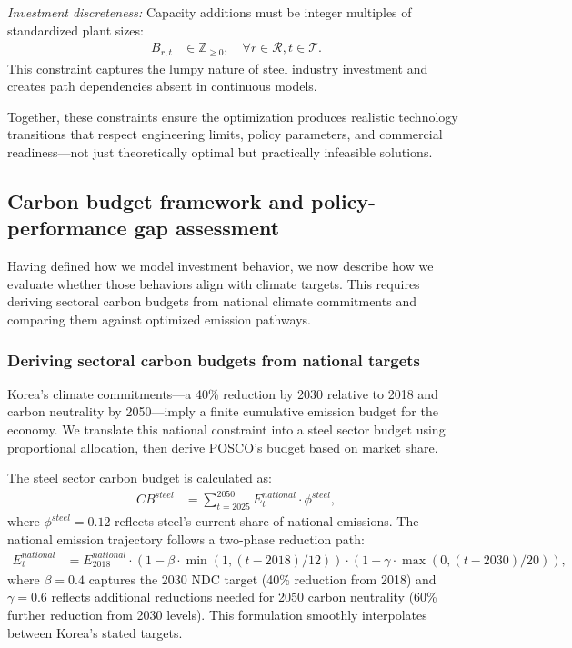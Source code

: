 \documentclass[preprint,1p,authoryear]{elsarticle}
\begin{document}
\textit{Investment discreteness:} Capacity additions must be integer multiples of standardized plant sizes:
\begin{align}
B_{r,t} &\in \mathbb{Z}_{\ge 0}, \quad \forall r \in \mathcal{R}, t \in \mathcal{T}. \label{eq:integer}
\end{align}
This constraint captures the lumpy nature of steel industry investment and creates path dependencies absent in continuous models.

Together, these constraints ensure the optimization produces realistic technology transitions that respect engineering limits, policy parameters, and commercial readiness—not just theoretically optimal but practically infeasible solutions.

\subsection{Carbon budget framework and policy-performance gap assessment}

Having defined how we model investment behavior, we now describe how we evaluate whether those behaviors align with climate targets. This requires deriving sectoral carbon budgets from national climate commitments and comparing them against optimized emission pathways.

\subsubsection{Deriving sectoral carbon budgets from national targets}

Korea's climate commitments—a 40\% reduction by 2030 relative to 2018 and carbon neutrality by 2050—imply a finite cumulative emission budget for the economy. We translate this national constraint into a steel sector budget using proportional allocation, then derive POSCO's budget based on market share.

The steel sector carbon budget is calculated as:
\begin{align}
CB^{steel} &= \sum_{t=2025}^{2050} E^{national}_t \cdot \phi^{steel}, \label{eq:budget_total}
\end{align}
where $\phi^{steel} = 0.12$ reflects steel's current share of national emissions. The national emission trajectory follows a two-phase reduction path:
\begin{align}
E^{national}_t &= E^{national}_{2018} \cdot (1 - \beta \cdot \min(1, (t-2018)/12)) \cdot (1 - \gamma \cdot \max(0, (t-2030)/20)), \label{eq:national_trajectory}
\end{align}
where $\beta = 0.4$ captures the 2030 NDC target (40\% reduction from 2018) and $\gamma = 0.6$ reflects additional reductions needed for 2050 carbon neutrality (60\% further reduction from 2030 levels). This formulation smoothly interpolates between Korea's stated targets.
\end{document}
